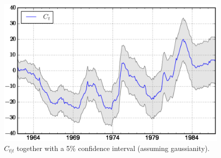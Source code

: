 \begin{figure}[h!]
	\centering
	\captionsetup{width=0.5\textwidth, font=small}
	\caption{$C_{t|t}$ together with a 5\% confidence interval (assuming gaussianity).}\label{fig:cei}
	\includegraphics[scale=0.6]{fig/CEI}
\end{figure}

